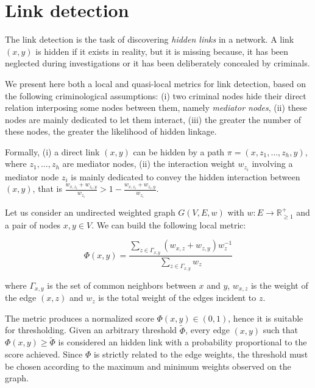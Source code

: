 \section{Link detection}
\label{sec:link-detection}

The link detection is the task of discovering \textit{hidden links} in a network. 
A link $(x,y)$ is hidden if it exists in reality, but it is missing because, it has been neglected during investigations or it has been deliberately concealed by criminals.

We present here both a local and quasi-local metrics for link detection, based on the following criminological assumptions: 
(i) two criminal nodes hide their direct relation interposing some nodes between them, namely \textit{mediator nodes}, 
(ii) these nodes are mainly dedicated to let them interact,
(iii) the greater the number of these nodes, the greater the likelihood of hidden linkage. 

Formally, 
(i) a direct link $(x,y)$ can be hidden by a path $\pi=(x,z_{1},\ldots,z_{h},y)$, where $z_{1},\ldots,z_{h}$ are mediator nodes,
(ii) the interaction weight $w_{z_{i}}$ involving a mediator node $z_{i}$ is mainly dedicated to convey the hidden interaction between $(x,y)$, that is $\frac{w_{x,z_{i}}+w_{z_{i},y}}{w_{z_{i}}} > 1- \frac{w_{x,z_{i}}+w_{z_{i},y}}{w_{z_{i}}}$.

Let us consider an undirected weighted graph $G(V,E,w)$ with $w:E\rightarrow\mathbb{R}_{\geq1}^{+}$ and a pair of nodes $x,y\in V$.
We can build the following local metric:

\begin{equation}
\label{eqn:detection-local}
\Phi(x,y)=
\frac{\sum\limits_{z\in\Gamma_{x,y}}(w_{x,z}+w_{z,y})w_{z}^{-1}}
{\sum\limits_{z\in\Gamma_{x,y}}w_{z}}
\end{equation}

where 
$\Gamma_{x,y}$ is the set of common neighbors between $x$ and $y$,
$w_{x,z}$ is the weight of the edge $(x,z)$ and
$w_{z}$ is the total weight of the edges incident to $z$.

The metric produces a normalized score $\Phi(x,y)\in(0,1)$, hence it is suitable for thresholding.
Given an arbitrary threshold $\tilde{\Phi}$, every edge $(x,y)$ such that $\Phi(x,y)\geq\tilde{\Phi}$ is considered an hidden link with a probability proportional to the score achieved.
Since $\Phi$ is strictly related to the edge weights, the threshold must be chosen according to the maximum and minimum weights observed on the graph. 

